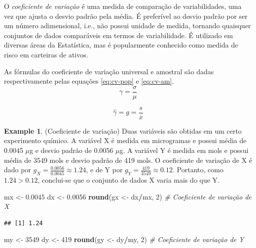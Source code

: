 \documentclass[
]{book}
\newenvironment{Shaded}{\begin{snugshade}}{\end{snugshade}}
\newcommand{\CommentTok}[1]{\textcolor[rgb]{0.56,0.35,0.01}{\textit{#1}}}
\newcommand{\DecValTok}[1]{\textcolor[rgb]{0.00,0.00,0.81}{#1}}
\newcommand{\FloatTok}[1]{\textcolor[rgb]{0.00,0.00,0.81}{#1}}
\newcommand{\KeywordTok}[1]{\textcolor[rgb]{0.13,0.29,0.53}{\textbf{#1}}}
\newcommand{\NormalTok}[1]{#1}
\newcommand{\OperatorTok}[1]{\textcolor[rgb]{0.81,0.36,0.00}{\textbf{#1}}}
\newcommand{\StringTok}[1]{\textcolor[rgb]{0.31,0.60,0.02}{#1}}
\theoremstyle{definition}
\theoremstyle{definition}
\newtheorem{example}{Example}[chapter]
\theoremstyle{definition}
\theoremstyle{remark}
\begin{document}
O \emph{coeficiente de variação} é uma medida de comparação de variabilidades, uma vez que ajusta o desvio padrão pela média. É preferível ao desvio padrão por ser um número adimensional, i.e., não possui unidade de medida, tornando quaisquer conjuntos de dados comparáveis em termos de variabilidade. É utilizado em diversas áreas da Estatística, mas é popularmente conhecido como medida de risco em carteiras de ativos.

As fórmulas do coeficiente de variação universal e amostral são dadas respectivamente pelas equações \eqref{eq:cv-pop} e \eqref{eq:cv-am}.
\begin{equation}
\gamma = \frac{\sigma}{\mu}
\label{eq:cv-pop}
\end{equation}

\begin{equation}
\hat{\gamma} = g = \frac{s}{\bar{x}}
\label{eq:cv-am}
\end{equation}

\begin{example}
\protect\hypertarget{exm:cv}{}{\label{exm:cv} }(Coeficiente de variação) Duas variáveis são obtidas em um certo experimento químico. A variável X é medida em microgramas e possui média de 0.0045 \(\mu\)g e desvio padrão de 0.0056 \(\mu\)g. A variável Y é medida em mols e possui média de 3549 mols e desvio padrão de 419 mols. O coeficiente de variação de X é dado por \(g_X=\frac{0.0056}{0.0045} \approx 1.24\), e de Y por \(g_Y=\frac{419}{3549} \approx 0.12\). Portanto, como \(1.24 > 0.12\), conclui-se que o conjunto de dados X varia mais do que Y.
\end{example}

\begin{Shaded}
\begin{Highlighting}[]
\NormalTok{mx \textless{}{-}}\StringTok{ }\FloatTok{0.0045}
\NormalTok{dx \textless{}{-}}\StringTok{ }\FloatTok{0.0056}
\KeywordTok{round}\NormalTok{(gx \textless{}{-}}\StringTok{ }\NormalTok{dx}\OperatorTok{/}\NormalTok{mx, }\DecValTok{2}\NormalTok{)   }\CommentTok{\# Coeficiente de variação de X}
\end{Highlighting}
\end{Shaded}

\begin{verbatim}
## [1] 1.24
\end{verbatim}

\begin{Shaded}
\begin{Highlighting}[]
\NormalTok{my \textless{}{-}}\StringTok{ }\DecValTok{3549}
\NormalTok{dy \textless{}{-}}\StringTok{ }\DecValTok{419}
\KeywordTok{round}\NormalTok{(gy \textless{}{-}}\StringTok{ }\NormalTok{dy}\OperatorTok{/}\NormalTok{my, }\DecValTok{2}\NormalTok{)   }\CommentTok{\# Coeficiente de variação de Y}
\end{Highlighting}
\end{Shaded}
\end{document}
